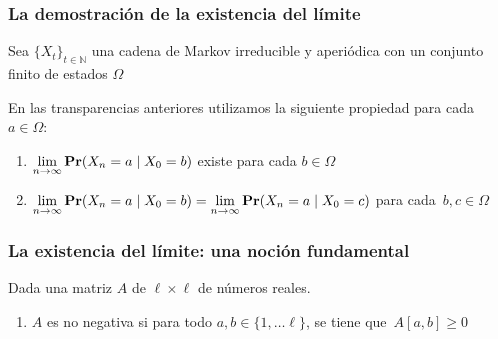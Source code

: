 \begin{frame}
\frametitle{La demostración de la existencia del límite}

{\footnotesize

Sea $\{ X_t \}_{t \in \mathbb{N}}$ una cadena de Markov irreducible y aperiódica con un conjunto finito de estados $\Omega$


En las transparencias anteriores utilizamos la siguiente propiedad para cada~$a \in \Omega$:
\begin{enumerate}
\item ${\displaystyle \lim_{n \to \infty} {\rm {\bf Pr}}(X_n = a \mid X_0 = b)}$ existe para cada $b \in \Omega$


\item ${\displaystyle \lim_{n \to \infty} {\rm {\bf Pr}}(X_n = a \mid X_0 = b) =\lim_{n \to \infty} {\rm {\bf Pr}}(X_n = a \mid X_0 = c)}$ para cada~$b, c \in \Omega$
\end{enumerate}



}
    
\end{frame}




\begin{frame}
\frametitle{La existencia del límite: una noción fundamental}

{\small


\begin{definicion}
Dada una matriz $A$ de $\ell \times \ell$ de números reales.
\begin{enumerate}
    \item $A$ es no negativa si para todo $a, b \in \{1, \dots \ell\}$, se tiene que~$A[a, b] \geq 0$
    
    
\end{enumerate}
\end{definicion}

}
    
\end{frame}

